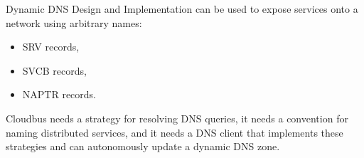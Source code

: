 \begin{frame}
{\begin{block}{Dynamic DNS Design and Implementation}
			can be used to expose services onto a network using arbitrary names:
			\small
			\begin{itemize}
				\item SRV records,
				\item SVCB records,
				\item NAPTR records.
			\end{itemize}
			\normalsize
			Cloudbus needs a strategy for resolving DNS queries, it needs a convention for naming distributed services, %
			and it needs a DNS client that implements these strategies and can autonomously update a dynamic DNS zone.
		\end{block}
	}
\end{frame}